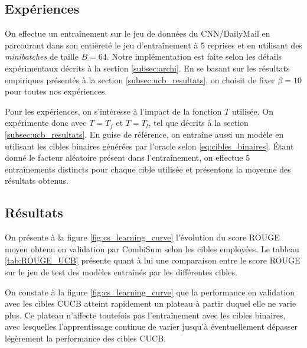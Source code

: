 \subsection{Expériences}

On effectue un entraînement sur le jeu de données du CNN/DailyMail en 
parcourant dans son entièreté le jeu d'entraînement à 5 reprises
et en utilisant des \textit{minibatches} de taille $B=64$.
Notre implémentation est faite selon les détails expérimentaux décrits à la section 
\ref{subsec:archi}.
En se basant sur les résultats empiriques présentés à la section \ref{subsec:ucb_resultats},
on choisit de fixer $\beta=10$ pour toutes nos expériences.

Pour les expériences, on s'intéresse à
l'impact de la fonction $T$ utilisée.
On expérimente donc avec $T = T_f$ et $T=T_l$,
tel que décrits à la section \ref{subsec:ucb_resultats}.
En guise de référence, on entraîne aussi un modèle 
en utilisant les cibles binaires générées par l'oracle selon \eqref{eq:cibles_binaires}.
Étant donné le facteur aléatoire présent dans l'entraînement, on effectue 
5 entraînements distincts pour chaque cible utilisée et présentons la moyenne
des résultats obtenus.

\subsection{Résultats}

On présente à la figure \ref{fig:cs_learning_curve} l'évolution 
du score ROUGE moyen obtenu en validation par CombiSum selon les cibles employées. 
Le tableau \ref{tab:ROUGE_UCB} présente quant à lui une comparaison 
entre le score ROUGE sur le jeu de test des modèles entraînés 
par les différentes cibles.

On constate à la figure \ref{fig:cs_learning_curve} que la performance en validation avec les cibles 
CUCB atteint rapidement un plateau à partir duquel elle 
ne varie plus.
Ce plateau n'affecte toutefois pas l'entraînement avec les cibles binaires,
avec lesquelles l'apprentissage continue de varier jusqu'à
éventuellement dépasser légèrement la performance des cibles CUCB.


